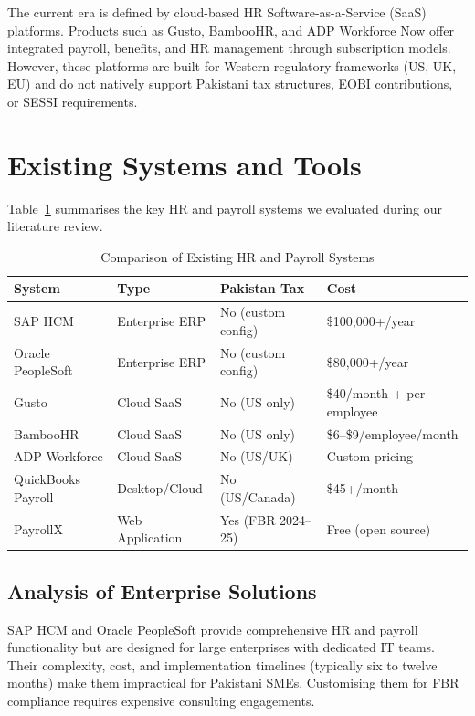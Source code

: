 \documentclass[12pt,a4paper]{report}
\begin{document}
The current era is defined by cloud-based HR Software-as-a-Service (SaaS) platforms. Products such as Gusto, BambooHR, and ADP Workforce Now offer integrated payroll, benefits, and HR management through subscription models. However, these platforms are built for Western regulatory frameworks (US, UK, EU) and do not natively support Pakistani tax structures, EOBI contributions, or SESSI requirements.

\section{Existing Systems and Tools}

Table~\ref{tab:tool_comparison} summarises the key HR and payroll systems we evaluated during our literature review.

\begin{table}[H]
\centering
\caption{Comparison of Existing HR and Payroll Systems}
\label{tab:tool_comparison}
\begin{tabular}{|l|l|l|l|}
\hline
\textbf{System} & \textbf{Type} & \textbf{Pakistan Tax} & \textbf{Cost} \\
\hline
SAP HCM         & Enterprise ERP    & No (custom config) & \$100,000+/year \\
\hline
Oracle PeopleSoft & Enterprise ERP  & No (custom config) & \$80,000+/year \\
\hline
Gusto           & Cloud SaaS        & No (US only)       & \$40/month + per employee \\
\hline
BambooHR        & Cloud SaaS        & No (US only)       & \$6--\$9/employee/month \\
\hline
ADP Workforce   & Cloud SaaS        & No (US/UK)         & Custom pricing \\
\hline
QuickBooks Payroll & Desktop/Cloud  & No (US/Canada)     & \$45+/month \\
\hline
PayrollX        & Web Application   & Yes (FBR 2024--25) & Free (open source) \\
\hline
\end{tabular}
\end{table}

\subsection{Analysis of Enterprise Solutions}

SAP HCM and Oracle PeopleSoft provide comprehensive HR and payroll functionality but are designed for large enterprises with dedicated IT teams. Their complexity, cost, and implementation timelines (typically six to twelve months) make them impractical for Pakistani SMEs. Customising them for FBR compliance requires expensive consulting engagements.
\end{document}
